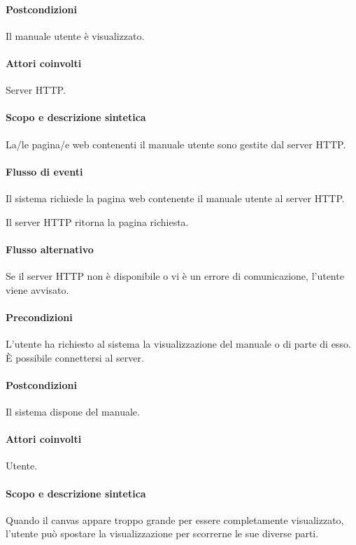 \paragraph{Postcondizioni} Il manuale utente \`e visualizzato.

\paragraph{Attori coinvolti} Server HTTP.
\paragraph{Scopo e descrizione sintetica}
La/le pagina/e web contenenti il manuale utente sono gestite dal server HTTP.
\paragraph{Flusso di eventi}
\begin{elenconumerato}[\textbf{}]{\subsubsecindent}
\item Il sistema richiede la pagina web contenente il manuale utente al server HTTP.
\item Il server HTTP ritorna la pagina richiesta.
\end{elenconumerato}
\paragraph{Flusso alternativo}
Se il server HTTP non \`e disponibile o vi \`e un errore di comunicazione, l'utente viene avvisato.
\paragraph{Precondizioni} L'utente ha richiesto al sistema la visualizzazione del manuale o di parte di esso. \`E possibile connettersi al server.
\paragraph{Postcondizioni} Il sistema dispone del manuale.

\paragraph{Attori coinvolti} Utente.
\paragraph{Scopo e descrizione sintetica}
Quando il canvas appare troppo grande per essere completamente visualizzato, l'utente pu\`o spostare la visualizzazione per scorrerne le sue diverse parti.
